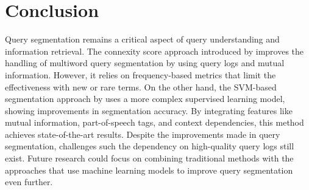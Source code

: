 \section{Conclusion} \label{conclusion}

Query segmentation remains a critical aspect of query understanding and information retrieval. The connexity score approach introduced by \citet{Risvik:2003} improves the handling of multiword query segmentation by using query logs and mutual information. However, it relies on frequency-based metrics that limit the effectiveness with new or rare terms. On the other hand, the SVM-based segmentation approach by \citet{Bergsma:2007} uses a more complex supervised learning model, showing improvements in segmentation accuracy. By integrating features like mutual information, part-of-speech tags, and context dependencies, this method achieves state-of-the-art results. Despite the improvements made in query segmentation, challenges such the dependency on high-quality query logs still exist. Future research could focus on combining traditional methods with the approaches that use machine learning models to improve query segmentation even further.